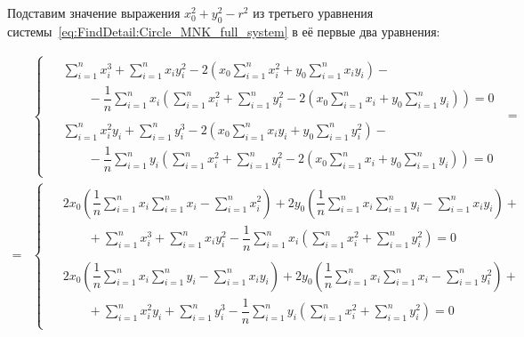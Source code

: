 Подставим значение выражения $x_0^2 + y_0^2 - r^2$ из третьего уравнения системы~\ref{eq:FindDetail:Circle_MNK_full_system} в её первые два уравнения:

\begin{align}
    \nonumber
    &\begin{cases}
         \begin{aligned}
             &\sum_{i=1}^{n} x_i^3 + \sum_{i=1}^{n} x_i y_i^2 - 2 \left(
             x_0 \sum_{i=1}^{n} x_i^2 + y_0 \sum_{i=1}^{n} x_i y_i \right) - \\
             &\qquad - \dfrac{1}{n} \sum_{i=1}^{n} x_i \left(
             \sum_{i=1}^{n} x_i^2 + \sum_{i=1}^{n} y_i^2
             - 2 \left( x_0 \sum_{i=1}^{n} x_i + y_0 \sum_{i=1}^{n} y_i \right)\right) = 0 \\
             \\
             &\sum_{i=1}^{n} x_i^2 y_i + \sum_{i=1}^{n} y_i^3 - 2 \left(
             x_0 \sum_{i=1}^{n} x_i y_i + y_0 \sum_{i=1}^{n} y_i^2 \right) - \\
             &\qquad - \dfrac{1}{n} \sum_{i=1}^{n} y_i \left(
             \sum_{i=1}^{n} x_i^2 + \sum_{i=1}^{n} y_i^2
             - 2 \left( x_0 \sum_{i=1}^{n} x_i + y_0 \sum_{i=1}^{n} y_i \right)\right) = 0
         \end{aligned}
    \end{cases} = \\ \nonumber
    = &\begin{cases}
           \begin{aligned}
               &2 x_0 \left( \dfrac{1}{n} \sum_{i=1}^{n} x_i \sum_{i=1}^{n} x_i - \sum_{i=1}^{n} x_i^2 \right)
               + 2 y_0 \left( \dfrac{1}{n} \sum_{i=1}^{n} x_i \sum_{i=1}^{n} y_i
               - \sum_{i=1}^{n} x_i y_i \right) + \\
               &\qquad + \sum_{i=1}^{n} x_i^3 + \sum_{i=1}^{n} x_i y_i^2
               - \dfrac{1}{n} \sum_{i=1}^{n} x_i
               \left( \sum_{i=1}^{n} x_i^2 + \sum_{i=1}^{n} y_i^2 \right) = 0 \\
               \\
               &2 x_0 \left( \dfrac{1}{n} \sum_{i=1}^{n} x_i \sum_{i=1}^{n} y_i
               - \sum_{i=1}^{n} x_i y_i \right)
               + 2 y_0 \left( \dfrac{1}{n} \sum_{i=1}^{n} x_i \sum_{i=1}^{n} x_i - \sum_{i=1}^{n} y_i^2 \right) + \\
               &\qquad + \sum_{i=1}^{n} x_i^2 y_i + \sum_{i=1}^{n} y_i^3
               - \dfrac{1}{n} \sum_{i=1}^{n} y_i
               \left(\sum_{i=1}^{n} x_i^2 + \sum_{i=1}^{n} y_i^2 \right) = 0

\end{aligned}
\end{cases}
\end{align}
